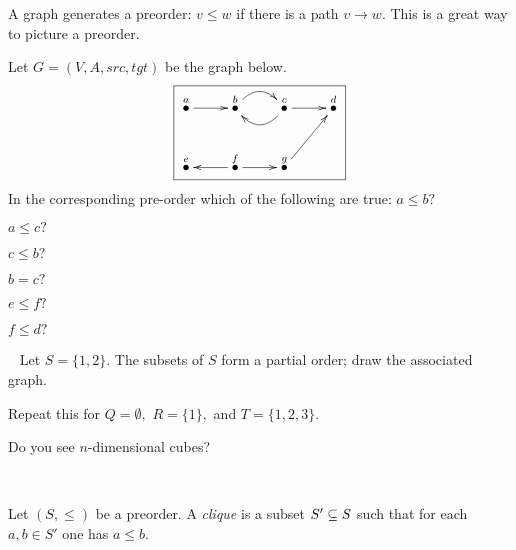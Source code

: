 \documentclass[../main/CT4S-EN-RU]{subfiles}
\begin{document}
\begin{remarkRUS}\label{rem:preorder to graph}
\end{remarkRUS}

\begin{sloganENG}
A graph generates a preorder: $v\leq w$ if there is a path $v\to w.$ This is a great way to picture a preorder. 
\end{sloganENG}

\begin{sloganRUS}
\end{sloganRUS}

\begin{exerciseENG}
Let $G=(V,A,src,tgt)$ be the graph below. 
$$\fbox{\xymatrix{
\LMO{a}\ar[r]&\LMO{b}\ar@/^1pc/[r]&\LMO{c}\ar@/^1pc/[l]\ar[r]&\LMO{d}\\
\LMO{e}&\LMO{f}\ar[l]\ar[r]&\LMO{g}\ar[ur]}}
$$
In the corresponding pre-order which of the following are true: 
\sexc $a\leq b?$
\item $a\leq c?$
\item $c\leq b?$
\item $b=c?$
\item $e\leq f?$
\item $f\leq d?$
\endsexc
\end{exerciseENG}

\begin{exerciseRUS}
\end{exerciseRUS}

\begin{exerciseENG}\label{exc:power poset}~
\sexc Let $S=\{1,2\}.$ The subsets of $S$ form a partial order; draw the associated graph. 
\item Repeat this for $Q=\emptyset,$ $R=\{1\},$ and $T=\{1,2,3\}.$ 
\item Do you see $n$-dimensional cubes?
\endsexc
\end{exerciseENG}

\begin{exerciseRUS}\label{exc:power poset}~
\end{exerciseRUS}

\begin{definitionENG}\label{def:clique}
Let $(S,\leq)$ be a preorder. A {\em clique} is a subset $S'\ss S$ such that for each $a,b\in S'$ one has $a\leq b.$
\end{definitionENG}

\begin{definitionRUS}\label{def:clique}
\end{definitionRUS}
\end{document}
